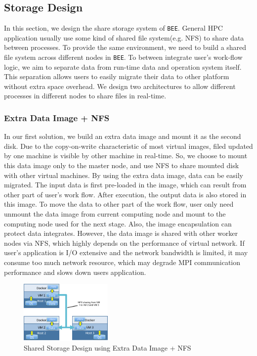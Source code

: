\subsection{Storage Design}
In this section, we design the share storage system of \texttt{BEE}. General HPC application usually use some kind of shared file system(e.g. NFS) to share data between processes. To provide the same environment, we need to build a shared file system across different nodes in \texttt{BEE}. To between integrate user's work-flow logic, we aim to separate data from run-time data and operation system itself. This separation allows users to easily migrate their data to other platform without extra space overhead. We design two architectures to allow different processes in different nodes to share files in real-time.

\subsubsection{Extra Data Image + NFS}
In our first solution, we build an extra data image and mount it as the second disk. Due to the copy-on-write characteristic of most virtual images, filed updated by one machine is visible by other machine in real-time. So, we choose to mount this data image only to the master node, and use NFS to share mounted disk with other virtual machines. By using the extra data image, data can be easily migrated. The input data is first pre-loaded in the image, which can result from other part of user's work flow. After execution, the output data is also stored in this image. To move the data to other part of the work flow, user only need unmount the data image from current computing node and mount to the computing node used for the next stage. Also, the image encapsulation can protect data integrates. However, the data image is shared with other worker nodes via NFS, which highly depends on the performance of virtual network. If user's application is I/O extensive and the network bandwidth is limited, it may consume too much network resource, which may degrade MPI communication performance and slows down users application.
\begin{figure}[h]
    \centering
    \caption{Shared Storage Design using Extra Data Image + NFS}
    \label{fs1}
    \includegraphics[width=0.4\textwidth]{figures/fs1.pdf}
\end{figure}

